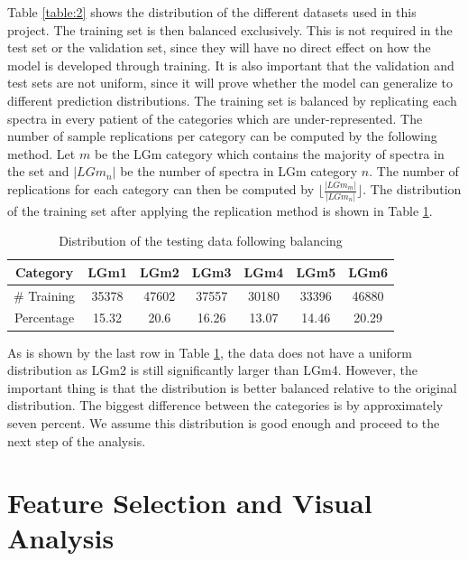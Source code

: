 Table \ref{table:2} shows the distribution of the different datasets used in this project. The training set is then balanced exclusively. This is not required in the test set or the validation set, since they will have no direct effect on how the model is developed through training. It is also important that the validation and test sets are not uniform, since it will prove whether the model can generalize to different prediction distributions. The training set is balanced by replicating each spectra in every patient of the categories which are under-represented. The number of sample replications per category can be computed by the following method. Let $m$ be the LGm category which contains the majority of spectra in the set and $|LGm_n|$ be the number of spectra in LGm category $n$. The number of replications for each category can then be computed by $\lfloor \frac{|LGm_m|}{|LGm_n|} \rfloor$. The distribution of the training set after applying the replication method is shown in Table \ref{table:3}.

\begin{table}[htb]
\centering
 \begin{tabular}{||c c c c c c c||} 
 \hline
 Category & LGm1 & LGm2 & LGm3 & LGm4 & LGm5 & LGm6 \\ [0.5ex] 
 \hline\hline
 \# Training & 35378 & 47602 & 37557 & 30180 & 33396 & 46880 \\
 \hline 
 Percentage & 15.32 & 20.6 & 16.26 & 13.07 & 14.46 & 20.29 \\
 \hline 

\end{tabular}
\caption{Distribution of the testing data following balancing}
\label{table:3}
\end{table}

As is shown by the last row in Table \ref{table:3}, the data does not have a uniform distribution as LGm2 is still significantly larger than LGm4. However, the important thing is that the distribution is better balanced relative to the original distribution. The biggest difference between the categories is by approximately seven percent. We assume this distribution is good enough and proceed to the next step of the analysis.


\section{Feature Selection and Visual Analysis}

